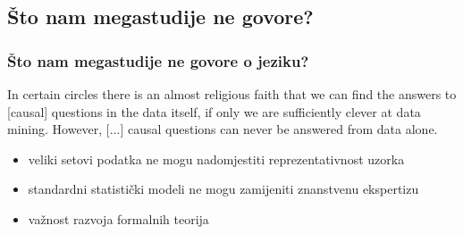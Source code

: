 \documentclass[aspectratio=169]{beamer}
\newcommand{\tinycitep}[1]{%
    \bgroup
    \scriptsize
    \citep{#1}
    \egroup}
\begin{document}
\subsection{Što nam megastudije ne govore?}

\begin{frame}
    \frametitle{Što nam megastudije ne govore o jeziku?}

    \hspace*{\fill}
    \raisebox{37.4pt}{
        \begin{minipage}[t]{1em}
            \fontsize{56}{66}\selectfont
            \bfseries
            ,,
        \end{minipage}
    }
    \begin{minipage}{24em}
        In certain circles there is an almost religious faith that we can find
        the answers to [causal] questions in the data itself, if only we are
        sufficiently clever at data mining. However, [...] causal questions
        can never be answered from data alone.

        \bigskip

        \raggedleft
        \scriptsize
        \citet[str. 351]{pearlBookWhyNew2018}
    \end{minipage}
    \hspace*{\fill}

\end{frame}

\begin{frame}
    \begin{itemize}
        \item veliki setovi podatka ne mogu nadomjestiti reprezentativnost
            uzorka \tinycitep{mengStatisticalParadisesParadoxes2018}

        \pause

        \item standardni statistički modeli ne mogu zamijeniti znanstvenu
            ekspertizu
            \bgroup
            \scriptsize
            \citep[str. 526]{mcelreathStatisticalRethinkingBayesian2020}
            \egroup

        \pause

        \item važnost razvoja formalnih teorija
            \tinycitep{fiedlerToolsToysTruisms2004,
            navarroIfMathematicalPsychology2020,navarroDevilDeepBlue2019}
    \end{itemize}
\end{frame}
\end{document}
